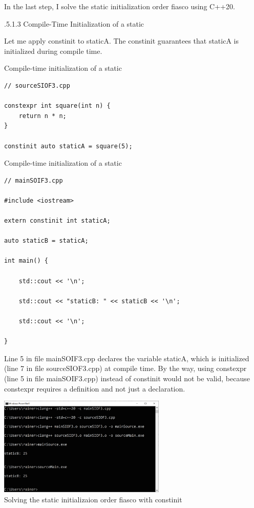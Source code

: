 In the last step, I solve the static initialization order fiasco using C++20.

.5.1.3\hspace{0.2cm} Compile-Time Initialization of a static

Let me apply constinit to staticA. The constinit guarantees that staticA is initialized during compile time.

\noindent
Compile-time initialization of a static
\begin{lstlisting}[style=styleCXX]
// sourceSIOF3.cpp

constexpr int square(int n) {
	return n * n;
}

constinit auto staticA = square(5);
\end{lstlisting}


\noindent
Compile-time initialization of a static
\begin{lstlisting}[style=styleCXX]
// mainSOIF3.cpp

#include <iostream>

extern constinit int staticA;

auto staticB = staticA;

int main() {
	
	std::cout << '\n';
	
	std::cout << "staticB: " << staticB << '\n';
	
	std::cout << '\n';

}
\end{lstlisting}

Line 5 in file mainSOIF3.cpp declares the variable staticA, which is initialized (line 7 in file sourceSIOF3.cpp) at compile time. By the way, using constexpr (line 5 in file mainSOIF3.cpp) instead of constinit would not be valid, because constexpr requires a definition and not just a declaration.

\begin{center}
\includegraphics[width=0.6\textwidth]{content/3/chapter4/images/39.png}\\
Solving the static initializaion order fiasco with constinit
\end{center}

